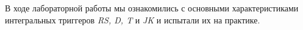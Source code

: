 \documentclass[bachelor, och, otchet, hidelinks]{SCWorks}
\begin{document}
\par В ходе лабораторной работы мы ознакомились с основными характеристиками интегральных триггеров \textit{RS, D,
T} и \textit{JK} и испытали их на практике.

\newpage

%

%
%
%


\appendix
\end{document}
